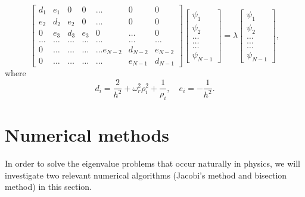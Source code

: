 \documentclass{article}
\begin{document}
\begin{equation}
\begin{bmatrix}d_1 & e_1 & 0   & 0    & \dots  &0     & 0 \\
e_2 & d_2 & e_2 & 0    & \dots  &0     &0 \\
0   & e_3 & d_3 & e_3  &0       &\dots & 0\\
\dots  & \dots & \dots & \dots  &\dots      &\dots & \dots\\
0   & \dots & \dots & \dots  &\dots  e_{N-2}     &d_{N-2} & e_{N-2}\\
0   & \dots & \dots & \dots  &\dots       &e_{N-1} & d_{N-1}
\end{bmatrix}  \begin{bmatrix} \psi_{1} \\
\psi_{2} \\
\dots\\ \dots\\ \dots\\
\psi_{N-1}
\end{bmatrix}=\lambda \begin{bmatrix} \psi_{1} \\
\psi_{2} \\
\dots\\ \dots\\ \dots\\
\psi_{N-1}
\end{bmatrix}, 
\label{eq:sematrix_two}
\end{equation}
where
\begin{equation}
d_i=\frac{2}{h^2}+\omega_r^2\rho_i^2+\frac{1}{\rho_i}, \quad
e_i=-\frac{1}{h^2}.
\end{equation}

	\section{Numerical methods}\label{method}
In order to solve the eigenvalue problems that occur naturally in physics, we will investigate two relevant numerical algorithms 
(Jacobi's method and bisection method) in this section.  
\end{document}
